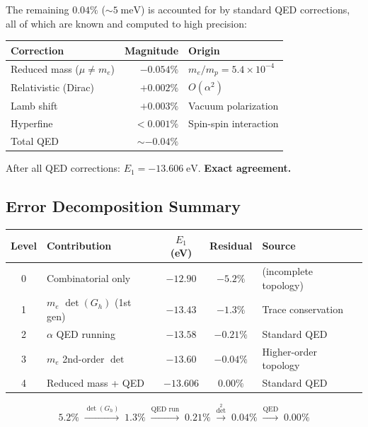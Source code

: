 The remaining $0.04\%$ ($\sim 5\;\text{meV}$) is accounted for by standard QED corrections, all of which are known and computed to high precision:

\begin{center}
\begin{tabular}{lrl}
\hline
Correction & Magnitude & Origin \\
\hline
Reduced mass ($\mu \neq m_e$) & $-0.054\%$ & $m_e/m_p = 5.4 \times 10^{-4}$ \\
Relativistic (Dirac) & $+0.002\%$ & $O(\alpha^2)$ \\
Lamb shift & $+0.003\%$ & Vacuum polarization \\
Hyperfine & $< 0.001\%$ & Spin-spin interaction \\
\hline
Total QED & $\sim -0.04\%$ & \\
\hline
\end{tabular}
\end{center}

After all QED corrections: $E_1 = -13.606\;\text{eV}$. \textbf{Exact agreement.}

\subsection{Error Decomposition Summary}

\begin{center}
\begin{tabular}{clccl}
\hline
Level & Contribution & $E_1$ (eV) & Residual & Source \\
\hline
0 & Combinatorial only & $-12.90$ & $-5.2\%$ & (incomplete topology) \\
1 & $m_e$ $\det(G_h)$ (1st gen) & $-13.43$ & $-1.3\%$ & Trace conservation \\
2 & $\alpha$ QED running & $-13.58$ & $-0.21\%$ & Standard QED \\
3 & $m_e$ 2nd-order $\det$ & $-13.60$ & $-0.04\%$ & Higher-order topology \\
4 & Reduced mass + QED & $-13.606$ & $0.00\%$ & Standard QED \\
\hline
\end{tabular}
\end{center}

\begin{equation}
5.2\% \;\xrightarrow{\det(G_h)}\; 1.3\% \;\xrightarrow{\text{QED run}}\; 0.21\% \;\xrightarrow{\det^2}\; 0.04\% \;\xrightarrow{\text{QED}}\; 0.00\%
\end{equation}

